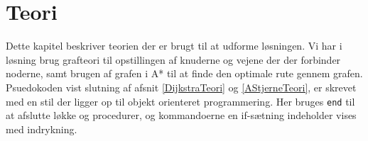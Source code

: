 \chapter{Teori}\label{Teori}
Dette kapitel beskriver teorien der er brugt til at udforme løsningen. Vi har i løsning brug grafteori til opstillingen af knuderne og vejene der der forbinder noderne, samt brugen af grafen i A* til at finde den optimale rute gennem grafen. Psuedokoden vist slutning af afsnit \ref{DijkstraTeori} og \ref{AStjerneTeori}, er skrevet med en stil der ligger op til objekt orienteret programmering. Her bruges \texttt{end} til at afslutte løkke og procedurer, og kommandoerne en if-sætning indeholder vises med indrykning.
\newpage

\newpage

















